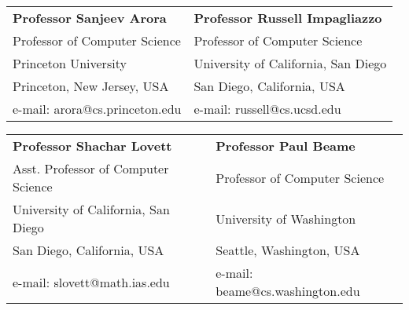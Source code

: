 \documentclass[margin,line]{resume}
\begin{document}
\begin{resume}
 \begin{tabular}{@{}p{6cm}p{6cm}}
 \textbf{Professor Sanjeev Arora}        &  \textbf{Professor Russell Impagliazzo}   \\
 Professor of Computer Science           &  Professor of Computer Science            \\
 Princeton University                    &  University of California, San Diego      \\
 Princeton, New Jersey, USA              &  San Diego, California, USA               \\
 e-mail: arora@cs.princeton.edu        &  e-mail: russell@cs.ucsd.edu    \\
 \end{tabular}

 \begin{tabular}{@{}p{6cm}p{6cm}}
 \textbf{Professor Shachar Lovett}    &  \textbf{Professor Paul Beame}        \\
 Asst. Professor of Computer Science   &  Professor of Computer Science                 \\
 University of California, San Diego       &  University of Washington       \\
 San Diego, California, USA                           &  Seattle, Washington, USA                \\
 e-mail: slovett@math.ias.edu           &  e-mail: beame@cs.washington.edu    \\
 \end{tabular}



\end{resume}
\end{document}
